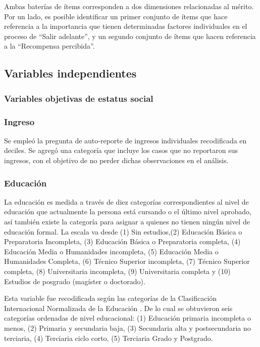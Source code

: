 \documentclass[12pt]{article}
\begin{document}
Ambas baterías de ítems corresponden a dos dimensiones relacionadas al mérito. Por un lado, es posible identificar un primer conjunto de ítems que hace referencia a la importancia que tienen determinadas factores individuales en el proceso de ``Salir adelante'', y un segundo conjunto de ítems que hacen referencia a la ``Recompensa percibida''. 

\subsection{Variables independientes}
\subsubsection{Variables objetivas de estatus social}
\subsubsection*{Ingreso}
	
Se empleó la pregunta de auto-reporte de ingresos individuales recodificada en deciles. Se agregó una categoría que incluye los casos que no reportaron sus ingresos, con el objetivo de no perder dichas observaciones en el análisis. 
	
\subsubsection*{Educación}
	
La educación es medida a través de diez categorías correspondientes al nivel de educación que actualmente la persona está cursando o el último nivel aprobado, así también existe la categoría para asignar a quienes no tienen ningún nivel de educación formal. La escala va desde (1) Sin estudios,(2) Educación Básica o Preparatoria Incompleta, (3) Educación Básica o Preparatoria completa, (4) Educación Media o Humanidades incompleta, (5) Educación Media o Humanidades Completa, (6) Técnico Superior incompleta, (7) Técnico Superior completa, (8) Universitaria incompleta, (9) Universitaria completa y (10) Estudios de posgrado (magíster o doctorado).
	
Esta variable fue recodificada según las categorías de la Clasificación Internacional Normalizada de la Educación \citep{cine2013}. De lo cual se obtuvieron seis categorías ordenadas de nivel educacional: (1) Educación primaria incompleta o menos, (2) Primaria y secundaria baja, (3) Secundaria alta y postsecundaria no terciaria, (4) Terciaria ciclo corto, (5) Terciaria Grado y Postgrado.    	
\end{document}
